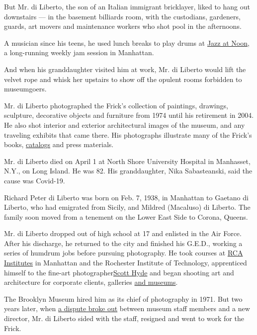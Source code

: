 But Mr. di Liberto, the son of an Italian immigrant bricklayer, liked to
hang out downstairs --- in the basement billiards room, with the
custodians, gardeners, guards, art movers and maintenance workers who
shot pool in the afternoons.

A musician since his teens, he used lunch breaks to play drums at
\href{https://cityroom.blogs.nytimes3xbfgragh.onion/2011/05/18/jazz-at-noon-is-closing-out-a-46-year-run/}{Jazz
at Noon}, a long-running weekly jam session in Manhattan.

And when his granddaughter visited him at work, Mr. di Liberto would
lift the velvet rope and whisk her upstairs to show off the opulent
rooms forbidden to museumgoers.

Mr. di Liberto photographed the Frick's collection of paintings,
drawings, sculpture, decorative objects and furniture from 1974 until
his retirement in 2004. He also shot interior and exterior architectural
images of the museum, and any traveling exhibits that came there. His
photographs illustrate many of the Frick's books,
\href{https://www.frick.org/shop/art_frick_collection/catalogue_volumes_v_and_vi}{catalogs}
and press materials.

Mr. di Liberto died on April 1 at North Shore University Hospital in
Manhasset, N.Y., on Long Island. He was 82. His granddaughter, Nika
Sabasteanski, said the cause was Covid-19.

Richard Peter di Liberto was born on Feb. 7, 1938, in Manhattan to
Gaetano di Liberto, who had emigrated from Sicily, and Mildred
(Macaluso) di Liberto. The family soon moved from a tenement on the
Lower East Side to Corona, Queens.

Mr. di Liberto dropped out of high school at 17 and enlisted in the Air
Force. After his discharge, he returned to the city and finished his
G.E.D., working a series of humdrum jobs before pursuing photography. He
took courses at
\href{https://www.nytimes3xbfgragh.onion/1973/08/14/archives/rca-school-here-plans-to-close-institute-cites-rise-in-costs-and.html}{RCA
Institutes} in Manhattan and the Rochester Institute of Technology,
apprenticed himself to the fine-art
photographer\href{https://www.mocp.org/detail.php?t=objects\&type=browse\&f=maker\&s=Hyde\%2C+Scott\&record=9}{Scott
Hyde} and began shooting art and architecture for corporate clients,
galleries
\href{nytimes3xbfgragh.onion/1971/05/09/archives/suffolk-buildings-1659-to-1971-are-shown-in-photos.html}{and
museums}.

The Brooklyn Museum hired him as its chief of photography in 1971. But
two years later, when
\href{https://www.nytimes3xbfgragh.onion/1973/11/27/archives/brooklyn-museum-split-over-policies-of-director-brooklyn-museum.html}{a
dispute broke out} between museum staff members and a new director, Mr.
di Liberto sided with the staff, resigned and went to work for the
Frick.

